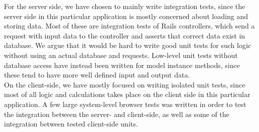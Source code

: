 
For the server side, we have chosen to mainly write integration
tests, since the server side in this particular application is mostly
concerned about loading and storing data. Most of these are integration
tests of Rails controllers, which send a request with input data to the
controller and asserts that correct data exist in database. We argue
that it would be hard to write good unit tests for such logic
without using an actual database and requests. Low-level unit tests
without database access have instead been written for model instance
methods, since these tend to have more well defined input and output
data.\\

On the client-side, we have mostly focused on writing isolated unit tests,
since most of all logic and calculations takes place on the
client side in this particular application. A few large system-level
browser tests was written in order to test the integration between the
server- and client-side, as well as some of the integration between
tested client-side units.\\
